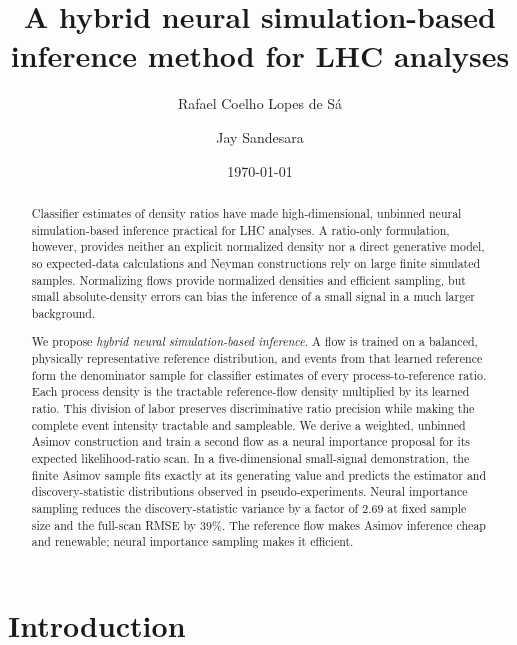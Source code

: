 \documentclass[
  aps,
  prd,
  superscriptaddress,
  nofootinbib,
  longbibliography,
  12pt
]{revtex4-2}
\begin{document}
\title{A hybrid neural simulation-based inference method for LHC analyses}

\author{Rafael Coelho Lopes de S\'a}
\author{Jay Sandesara}

\date{\today}

\begin{abstract}
Classifier estimates of density ratios have made high-dimensional, unbinned neural simulation-based inference practical for LHC analyses.  A ratio-only formulation, however, provides neither an explicit normalized density nor a direct generative model, so expected-data calculations and Neyman constructions rely on large finite simulated samples.  Normalizing flows provide normalized densities and efficient sampling, but small absolute-density errors can bias the inference of a small signal in a much larger background.

We propose \emph{hybrid neural simulation-based inference}.  A flow is trained on a balanced, physically representative reference distribution, and events from that learned reference form the denominator sample for classifier estimates of every process-to-reference ratio.  Each process density is the tractable reference-flow density multiplied by its learned ratio.  This division of labor preserves discriminative ratio precision while making the complete event intensity tractable and sampleable.  We derive a weighted, unbinned Asimov construction and train a second flow as a neural importance proposal for its expected likelihood-ratio scan.  In a five-dimensional small-signal demonstration, the finite Asimov sample fits exactly at its generating value and predicts the estimator and discovery-statistic distributions observed in pseudo-experiments.  Neural importance sampling reduces the discovery-statistic variance by a factor of $2.69$ at fixed sample size and the full-scan RMSE by $39\%$.  The reference flow makes Asimov inference cheap and renewable; neural importance sampling makes it efficient.
\end{abstract}

\maketitle

\section{Introduction}
\label{sec:introduction}
\end{document}
